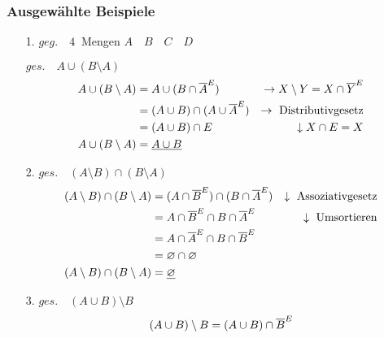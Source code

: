             \subsubsection{Ausgewählte Beispiele}
                \begin{itemize}[leftmargin=*]
                    \item[1.] $geg.\quad 4~$ Mengen $A \quad B \quad C \quad D$
                    \item[]   $ges.\quad A \cup (B \setminus A)$
                        \begin{align*}
                            A \cup (B \setminus A) & =A \cup (B \cap \overline{A}^E) & \rightarrow X \setminus Y = X \cap \overline{Y}^E \\
                                                   & =(A \cup B) \cap (A \cup \overline{A}^E)& \rightarrow \text{~Distributivgesetz}\\
                                                   & =(A \cup B) \cap E & \downarrow X \cap E = X \\
                            A \cup (B \setminus A) & =\underline{A \cup B} &\\
                        \end{align*}
                    \item[2.]  $ges.\quad (A \setminus B) \cap (B \setminus A)$
                        \begin{align*}
                                (A \setminus B) \cap (B \setminus A) & = (A \cap \overline{B}^E) \cap (B \cap \overline{A}^E) & \downarrow \text{~Assoziativgesetz} \\
                                & = A \cap \overline{B}^E \cap B \cap \overline{A}^E & \downarrow \text{~Umsortieren} \\
                                & = A \cap \overline{A}^E \cap B \cap \overline{B}^E & \\
                                & = \varnothing \cap \varnothing & \\
                                (A \setminus B) \cap (B \setminus A) & = \underline{\varnothing} & \\
                        \end{align*}
                    \item[3.] $ges.\quad (A \cup B) \setminus B$ %
                        \begin{align*}
                            (A \cup B) \setminus B & = (A \cup B) \cap \komplement{B} \\

\end{align*}
\end{itemize}
